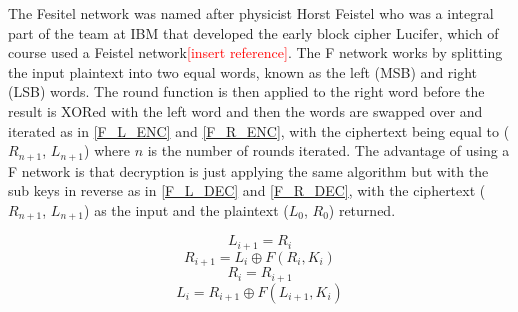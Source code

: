 \documentclass[12pt,twoside,a4paper]{report}
\begin{document}
	The Fesitel network was named after physicist Horst Feistel who was a integral part of the team at IBM that developed the early block cipher Lucifer, which of course used a Feistel network\textcolor{red}{[insert reference]}. The F network works by splitting the input plaintext into two equal words, known as the left (MSB) and right (LSB) words. The round function is then applied to the right word before the result is XORed with the left word and then the words are swapped over and iterated as in \autoref{F_L_ENC} and \ref{F_R_ENC}, with the ciphertext being equal to ($R_{n+1}$, $L_{n+1}$) where $n$ is the number of rounds iterated. The advantage of using a F network is that decryption is just applying the same algorithm but with the sub keys in reverse as in \autoref{F_L_DEC} and \ref{F_R_DEC}, with the ciphertext ($R_{n+1}$, $L_{n+1}$) as the input and the plaintext ($L_0$, $R_0$) returned.
    


	\begin{equation}
	\label{F_L_ENC}
	L_{i+1} = R_i
	\end{equation}
	\begin{equation}
	\label{F_R_ENC}
	R_{i+1} = L_i \oplus F(R_i, K_i)
	\end{equation}
	\begin{equation}
	\label{F_L_DEC}
	R_i = R_{i+1}
	\end{equation}
	\begin{equation}
	\label{F_R_DEC}
	L_i = R_{i+1} \oplus F(L_{i+1}, K_i)
	\end{equation}
    
\end{document}
